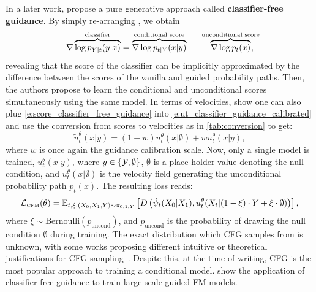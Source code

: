 \documentclass{fairmeta}
\newcommand{\highlight}[1]{{\color{metablue} \textbf{#1}}}
\renewcommand{\eqref}[1]{\labelcref{#1}}
\numberwithin{equation}{section}
\begin{document}
In a later work, \citep{ho2021classifierfree} propose a pure generative approach called \highlight{classifier-free guidance}.
By simply re-arranging \eqref{e:score_classifier_guidance}, we obtain 
\begin{equation}\label{e:score_classifier_free_guidance}
     \nabla \overbrace{\log p_{Y|t}(y|x)}^{\text{{classifier}}} = \overbrace{\nabla\log p_{t|Y}(x|y)}^{\text{{conditional score}}} \ \  - \overbrace{\nabla\log p_t(x)}^{\text{{unconditional score}}}\hspace{-10pt},
\end{equation}
revealing that the score of the classifier can be implicitly approximated by the difference between the scores of the vanilla and guided probability paths.
Then, the authors propose to learn the conditional and unconditional scores simultaneously using the same model.
In terms of velocities, \cite{zheng2023guided} show one can also plug \ref{e:score_classifier_free_guidance} into \ref{e:ut_classifier_guidance_calibrated} and use the conversion from scores to velocities as in \cref{tab:conversion} to get:
\begin{equation}\label{e:ut_cfg}
    \tilde{u}_t^{\theta}(x|y) = (1-w)u_t^\theta(x|\emptyset) + wu_t^\theta(x|y),
\end{equation}
where $w$ is once again the guidance calibration scale. Now, only a single model is trained, $u_t^\theta(x|y)$, where $y\in\left\{{\mathcal{Y}},\emptyset \right\}$, $\emptyset$ is a place-holder value denoting the null-condition, and $u_t^\theta(x|\emptyset)$ is the velocity field generating the unconditional probability path $p_t(x)$.
The resulting loss reads:
\begin{equation}\label{e:cfm_psi_cfg}
    {\mathcal{L}}_{\scriptscriptstyle \text{CFM}}(\theta) = \mathbb{E}_{t,\xi, (X_0,X_1,Y)\sim \pi_{0,1,Y}} \left [D\left (\dot{\psi}_t(X_0|X_1), u_t^\theta(X_t|(1-\xi)\cdot Y + \xi \cdot \emptyset)\right )\right ],
\end{equation}
where $\xi\sim\text{Bernoulli}(p_{\mathrm{uncond}})$, and $p_{\mathrm{uncond}}$ is the probability of drawing the null condition $\emptyset$ during training.
The exact distribution which CFG samples from is unknown, with some works proposing different intuitive or theoretical justifications for CFG sampling~\citep{dieleman2022guidance,guo2024gradient,chidambaram2024does,bradley2024classifier}. Despite this, at the time of writing, CFG is the most popular approach to training a conditional model.
\citet{esser2024scaling,polyak2024moviegencastmedia} show the application of classifier-free guidance to train large-scale guided FM models.
\end{document}
